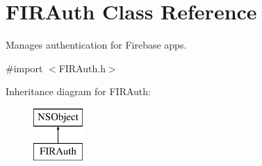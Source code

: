 \hypertarget{interface_f_i_r_auth}{}\section{F\+I\+R\+Auth Class Reference}
\label{interface_f_i_r_auth}


Manages authentication for Firebase apps.  




{\ttfamily \#import $<$F\+I\+R\+Auth.\+h$>$}

Inheritance diagram for F\+I\+R\+Auth\+:\begin{figure}[H]
\begin{center}
\leavevmode
\includegraphics[height=2.000000cm]{interface_f_i_r_auth}
\end{center}
\end{figure}
